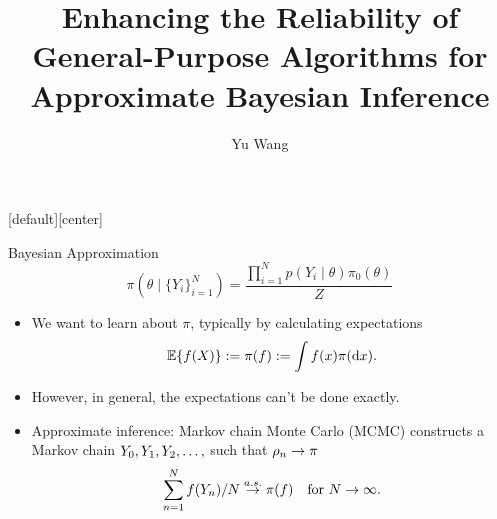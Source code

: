\documentclass[10pt,xcolor=table]{beamer}
\title{Enhancing the Reliability of General-Purpose Algorithms for Approximate Bayesian Inference}
\author{Yu Wang}
\begin{document}
{
\maketitle
}

[default][center]



\begin{frame}{Bayesian Approximation}
	\begin{equation*}
		\pi\left(\theta \mid \{Y_{i}\}_{i=1}^{N} \right)=\frac{\prod_{i=1}^{N} p(Y_{i} \mid \theta) \pi_0(\theta)}{Z}
	\end{equation*}
	\begin{itemize}
		\item We want to learn about $\pi$, typically by calculating expectations
		$$\mathbb{E}\{f(X_{})\} := \pi(f) := \int f(x) \pi(\mathrm{d}x).$$ \pause
		\item However, in general, the expectations can’t be done exactly. \pause
		\item Approximate inference: Markov chain Monte Carlo (MCMC) constructs a Markov chain $Y_{0}, Y_{1}, Y_{2}, \dots,$ such that $\rho_{n} \to \pi$
		\[
		\sum_{n=1}^{N} f(Y_{n}) / N \overset{a.s.}{\to} \pi(f) \quad\text{for } N \to \infty. \label{eq:SLLN}
		\]
	\end{itemize}
\end{frame}
\end{document}

